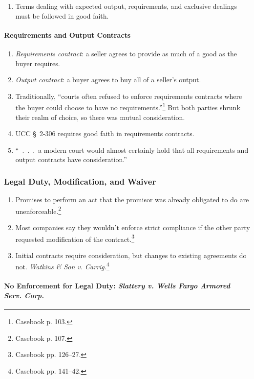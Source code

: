 \begin{enumerate}
    \item Terms dealing with expected output, requirements, and exclusive 
    dealings must be followed in good faith.
\end{enumerate}

\paragraph{Requirements and Output Contracts}

\begin{enumerate}
    \item \emph{Requirements contract}: a seller agrees to provide as much of 
    a good as the buyer requires.
    \item \emph{Output contract}: a buyer agrees to buy all of a seller's 
    output.
    \item Traditionally, ``courts often refused to enforce requirements 
    contracts where the buyer could choose to have no 
    requirements.''\footnote{Casebook p. 103.} But both parties shrunk their 
    realm of choice, so there was mutual consideration.
    \item UCC \S\ 2-306 requires good faith in requirements contracts.
    \item ``~.~.~.~a modern court would almost certainly hold that all 
    requirements and output contracts have consideration.''
\end{enumerate}

\subsubsection{Legal Duty, Modification, and Waiver}

\begin{enumerate}
    \item Promises to perform an act that the promisor was already obligated 
    to do are unenforceable.\footnote{Casebook p. 107.}
    \item Most companies say they wouldn't enforce strict compliance if the 
    other party requested modification of the contract.\footnote{Casebook pp. 
    126--27.}
    \item Initial contracts require consideration, but changes to existing 
    agreements do not. \emph{Watkins \& Son v. Carrig.}\footnote{Casebook pp. 
    141--42.}
\end{enumerate}

\paragraph{No Enforcement for Legal Duty: \emph{Slattery v. Wells Fargo 
Armored Serv. Corp.}}

